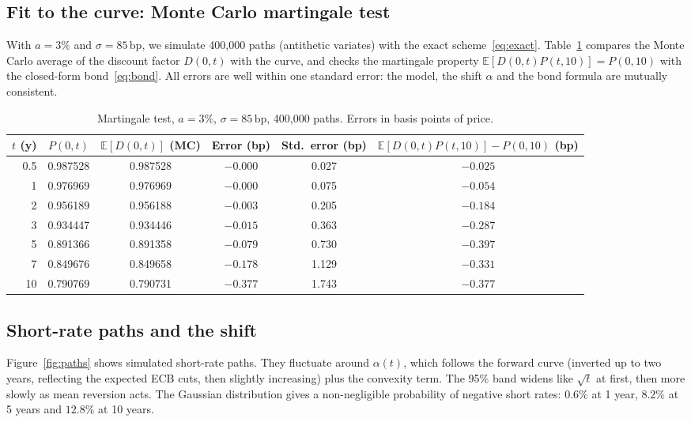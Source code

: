 \documentclass[11pt,a4paper]{article}
\theoremstyle{plain}
\theoremstyle{definition}
\newcommand{\E}{\mathbb{E}}
\newcommand{\bp}{\,\mathrm{bp}}
\begin{document}
\subsection{Fit to the curve: Monte Carlo martingale test}
With $a=3\%$ and $\sigma=85\bp$, we simulate 400{,}000 paths (antithetic variates) with the exact scheme~\eqref{eq:exact}. Table~\ref{tab:martingale} compares the Monte Carlo average of the discount factor $D(0,t)$ with the curve, and checks the martingale property $\E[D(0,t)P(t,10)]=P(0,10)$ with the closed-form bond~\eqref{eq:bond}. All errors are well within one standard error: the model, the shift $\alpha$ and the bond formula are mutually consistent.

\begin{table}[htbp]
\centering
\small
\begin{tabular}{@{}rccccc@{}}
\toprule
$t$ (y) & $P(0,t)$ & $\E[D(0,t)]$ (MC) & Error (bp) & Std.\ error (bp) & $\E[D(0,t)P(t,10)]-P(0,10)$ (bp) \\
\midrule
0.5 & 0.987528 & 0.987528 & $-0.000$ & 0.027 & $-0.025$ \\
1   & 0.976969 & 0.976969 & $-0.000$ & 0.075 & $-0.054$ \\
2   & 0.956189 & 0.956188 & $-0.003$ & 0.205 & $-0.184$ \\
3   & 0.934447 & 0.934446 & $-0.015$ & 0.363 & $-0.287$ \\
5   & 0.891366 & 0.891358 & $-0.079$ & 0.730 & $-0.397$ \\
7   & 0.849676 & 0.849658 & $-0.178$ & 1.129 & $-0.331$ \\
10  & 0.790769 & 0.790731 & $-0.377$ & 1.743 & $-0.377$ \\
\bottomrule
\end{tabular}
\caption{Martingale test, $a=3\%$, $\sigma=85\bp$, 400{,}000 paths. Errors in basis points of price.}
\label{tab:martingale}
\end{table}

\subsection{Short-rate paths and the shift}
Figure~\ref{fig:paths} shows simulated short-rate paths. They fluctuate around $\alpha(t)$, which follows the forward curve (inverted up to two years, reflecting the expected ECB cuts, then slightly increasing) plus the convexity term. The 95\% band widens like $\sqrt{t}$ at first, then more slowly as mean reversion acts. The Gaussian distribution gives a non-negligible probability of negative short rates: $0.6\%$ at 1 year, $8.2\%$ at 5 years and $12.8\%$ at 10 years.
\end{document}
